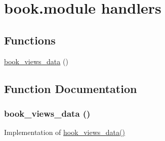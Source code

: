 \hypertarget{group__views__book__module}{
\section{book.module handlers}
\label{group__views__book__module}
}
\subsection*{Functions}
\begin{CompactItemize}
\item 
\hyperlink{group__views__book__module_gf22995b80b019a7b00c8455590690c6f}{book\_\-views\_\-data} ()
\end{CompactItemize}


\subsection{Function Documentation}
\hypertarget{group__views__book__module_gf22995b80b019a7b00c8455590690c6f}{
\subsubsection[{book\_\-views\_\-data}]{\setlength{\rightskip}{0pt plus 5cm}book\_\-views\_\-data ()}}
\label{group__views__book__module_gf22995b80b019a7b00c8455590690c6f}


Implementation of \hyperlink{group__views__hooks_g227057901681e4a33e33c199c7a8c989}{hook\_\-views\_\-data()} 